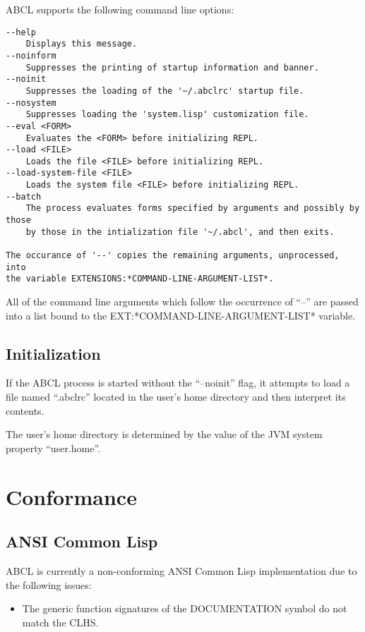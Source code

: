 \documentclass[10pt]{book}
\begin{document}
ABCL supports the following command line options:

\begin{verbatim}
--help
    Displays this message.
--noinform
    Suppresses the printing of startup information and banner.
--noinit
    Suppresses the loading of the '~/.abclrc' startup file.
--nosystem
    Suppresses loading the 'system.lisp' customization file. 
--eval <FORM>
    Evaluates the <FORM> before initializing REPL.
--load <FILE>
    Loads the file <FILE> before initializing REPL.
--load-system-file <FILE>
    Loads the system file <FILE> before initializing REPL.
--batch
    The process evaluates forms specified by arguments and possibly by those
    by those in the intialization file '~/.abcl', and then exits.

The occurance of '--' copies the remaining arguments, unprocessed, into
the variable EXTENSIONS:*COMMAND-LINE-ARGUMENT-LIST*.
\end{verbatim}

All of the command line arguments which follow the occurrence of ``--''
are passed into a list bound to the EXT:*COMMAND-LINE-ARGUMENT-LIST*
variable.

\section{Initialization}

If the ABCL process is started without the ``--noinit'' flag, it
attempts to load a file named ``.abclrc'' located in the user's home
directory and then interpret its contents.  

The user's home directory is determined by the value of the JVM system
property ``user.home''.

\chapter{Conformance}

\section{ANSI Common Lisp}
\textsc{ABCL} is currently a non-conforming ANSI Common Lisp implementation due
to the following issues:

\begin{itemize}
  \item The generic function signatures of the DOCUMENTATION symbol do
    not match the CLHS.
\end{itemize}
\end{document}
